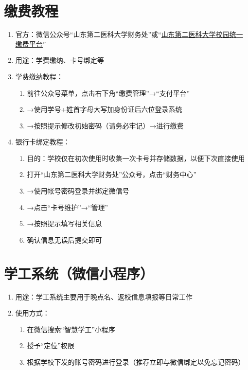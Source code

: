 \section[缴费教程]{缴费教程}
\label{fee_pay}
\begin{enumerate}
      \item 官方：微信公众号“山东第二医科大学财务处”或“\uline{\href{http://tyzfpt.wfmc.edu.cn/xysf/login.aspx}{山东第二医科大学校园统一缴费平台}}”
      \item 用途：学费缴纳、卡号绑定等
      \item 学费缴纳教程：
            \begin{enumerate}
                  \item 前往公众号菜单，点击右下角“缴费管理”→“支付平台”
                  \item →使用学号+姓首字母大写加身份证后六位登录系统
                  \item →按照提示修改初始密码（请务必牢记）→进行缴费
            \end{enumerate}
      \item 银行卡绑定教程：
            \begin{enumerate}
                  \item 目的：学校仅在初次使用时收集一次卡号并存储数据，以便下次直接使用\footnotemark
                  \item 打开“山东第二医科大学财务处”公众号，点击“财务中心”
                  \item →使用帐号密码登录\footnotemark 并绑定微信号
                  \item →点击“卡号维护”→“管理”
                  \item →按照提示填写相关信息
                  \item 确认信息无误后提交即可
            \end{enumerate}
\end{enumerate}

\section[学工系统（微信小程序）]{学工系统（微信小程序）}
\begin{enumerate}
      \item 用途：学工系统主要用于晚点名、返校信息填报等日常工作\footnotemark
      \item 使用方式：
            \begin{enumerate}
                  \item 在微信搜索“智慧学工”小程序
                  \item 授予“定位”权限
                  \item 根据学校下发的账号密码进行登录（推荐立即与微信绑定以免忘记密码）
            \end{enumerate}
\end{enumerate}

